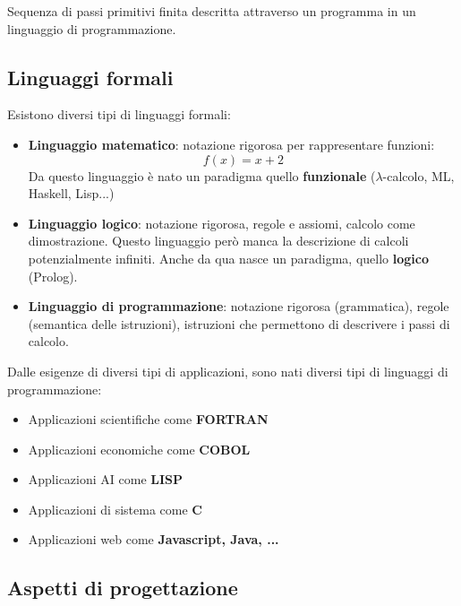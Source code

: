\documentclass[a4paper]{article}
\begin{document}
{
    Sequenza di passi primitivi finita descritta 
    attraverso un programma in un linguaggio di programmazione.
}
\noindent

\subsection{Linguaggi formali}

Esistono diversi tipi di linguaggi formali:
\begin{itemize}
    \item \textbf{Linguaggio matematico}: notazione rigorosa per rappresentare funzioni:
    \[f(x) = x+2\]
    Da questo linguaggio è nato un paradigma quello \textbf{funzionale}
    ($\lambda$-calcolo, ML, Haskell, Lisp...)
    \item \textbf{Linguaggio logico}: notazione rigorosa, regole e assiomi, calcolo come dimostrazione.
    Questo linguaggio però manca la descrizione di calcoli potenzialmente infiniti.
    Anche da qua nasce un paradigma, quello \textbf{logico} (Prolog).
    \item \textbf{Linguaggio di programmazione}: notazione rigorosa (grammatica), regole 
    (semantica delle istruzioni), istruzioni che permettono
    di descrivere i passi di calcolo. 
\end{itemize}
Dalle esigenze di diversi tipi di applicazioni, sono nati diversi tipi di linguaggi di programmazione:
\begin{itemize}
    \item Applicazioni scientifiche come \textbf{FORTRAN}
    \item Applicazioni economiche come \textbf{COBOL}
    \item Applicazioni AI come \textbf{LISP}
    \item Applicazioni di sistema come \textbf{C}
    \item Applicazioni web come \textbf{Javascript, Java, ...}
\end{itemize}

\subsection{Aspetti di progettazione}
\end{document}
